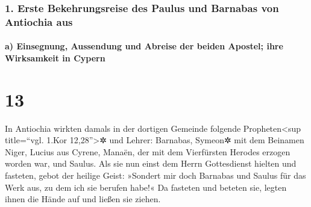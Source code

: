 \hypertarget{erste-bekehrungsreise-des-paulus-und-barnabas-von-antiochia-aus}{%
\subsubsection{1. Erste Bekehrungsreise des Paulus und Barnabas von
Antiochia
aus}\label{erste-bekehrungsreise-des-paulus-und-barnabas-von-antiochia-aus}}

\hypertarget{a-einsegnung-aussendung-und-abreise-der-beiden-apostel-ihre-wirksamkeit-in-cypern}{%
\paragraph{a) Einsegnung, Aussendung und Abreise der beiden Apostel;
ihre Wirksamkeit in
Cypern}\label{a-einsegnung-aussendung-und-abreise-der-beiden-apostel-ihre-wirksamkeit-in-cypern}}

\hypertarget{section-12}{%
\section{13}\label{section-12}}

 In Antiochia wirkten damals in der dortigen Gemeinde
folgende Propheten\textless sup title=``vgl. 1.Kor 12,28''\textgreater✲
und Lehrer: Barnabas, Symeon✲ mit dem Beinamen Niger, Lucius aus Cyrene,
Manaën, der mit dem Vierfürsten Herodes erzogen worden war, und Saulus.
 Als sie nun einst dem Herrn Gottesdienst hielten und
fasteten, gebot der heilige Geist: »Sondert mir doch Barnabas und Saulus
für das Werk aus, zu dem ich sie berufen habe!«  Da
fasteten und beteten sie, legten ihnen die Hände auf und ließen sie
ziehen.

